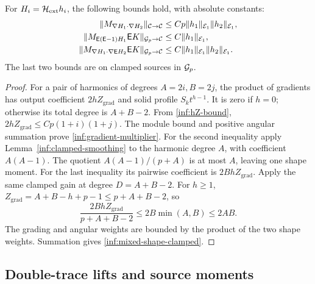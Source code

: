 \begin{proposition}\label{inf:grouped-shapes}
For $H_i=\mathcal H_{\mathrm{ext}} h_i$, the following bounds hold, with absolute
constants:
\begin{align}
 \lVert M_{\nabla H_1\cdot\nabla H_2}\rVert_{\mathcal C\to\mathcal C}
 &\le Cp\lVert h_1\rVert_{\mathcal E_1}\lVert h_2\rVert_{\mathcal E_1},
 \label{inf:gradient-multiplier}\\
 \lVert M_{\mathsf E(\mathsf E-1)H_1}\mathsf E K\rVert_{\mathcal{G}_p\to\mathcal C}
 &\le C\lVert h_1\rVert_{\mathcal E_1},\label{inf:second-shape-clamped}\\
 \lVert M_{\nabla H_1\cdot\nabla\mathsf E H_2}\mathsf E K\rVert_{\mathcal{G}_p\to\mathcal C}
 &\le C\lVert h_1\rVert_{\mathcal E_1}\lVert h_2\rVert_{\mathcal E_1}.
 \label{inf:mixed-shape-clamped}
\end{align}
The last two bounds are on clamped sources in $\mathcal{G}_p$.
\end{proposition}
\begin{proof}
For a pair of harmonics of degrees $A=2i,B=2j$, the product of
gradients has output coefficient $2hZ_{\mathrm{grad}}$ and solid profile
$S_kt^{h-1}$. It is zero if $h=0$; otherwise its total degree is
$A+B-2$. From \eqref{inf:hZ-bound},
$2hZ_{\mathrm{grad}}\le Cp(1+i)(1+j)$.
The module bound and positive angular summation prove
\eqref{inf:gradient-multiplier}.
For the second inequality apply Lemma~\ref{inf:clamped-smoothing}
to the harmonic degree $A$, with coefficient $A(A-1)$.
The quotient $A(A-1)/(p+A)$ is at most $A$, leaving one shape
moment.
For the last inequality its pairwise coefficient is $2BhZ_{\mathrm{grad}}$.
Apply the same clamped gain at degree $D=A+B-2$.
For $h\ge1$, $Z_{\mathrm{grad}}=A+B-h+p-1\le p+A+B-2$, so
\[
 \frac{2BhZ_{\mathrm{grad}}}{p+A+B-2}\le2B\min(A,B)\le2AB.
\]
The grading and angular weights are bounded by the product of the
two shape weights. Summation gives \eqref{inf:mixed-shape-clamped}.
\end{proof}

\subsection{Double-trace lifts and source moments}

